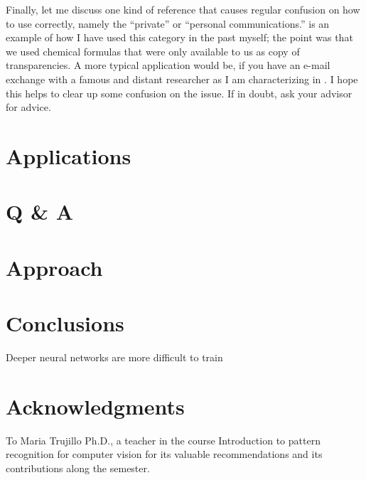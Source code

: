 \documentclass[12pt]{article}
\numberwithin{equation}{section}
\numberwithin{table}{section}
\numberwithin{figure}{section}
\begin{document}
Finally, let me discuss one kind of reference that causes regular
confusion on how to use correctly, namely the ``private'' or ``personal
communications.''
\cite{Ho95} is an example of how I have used this category in the past myself;
the point was that we used chemical formulas that were only
available to us as copy of transparencies. A more typical application
would be, if you have an e-mail exchange with a famous and distant researcher
as I am characterizing in \cite{BigShot}. I hope this helps to clear
up some confusion on the issue. If in doubt, ask your advisor for advice.

\section{Applications} \label{applications}




\section{Q \& A} \label{qa}

\section{Approach} \label{approach}


\section{Conclusions}

Deeper neural networks are more difficult to train \cite{Zagoruyko2016}






\section*{Acknowledgments}

To Maria Trujillo Ph.D., a teacher in the course Introduction to pattern recognition for computer vision for its valuable recommendations and its contributions along the semester.
 




\end{document}
